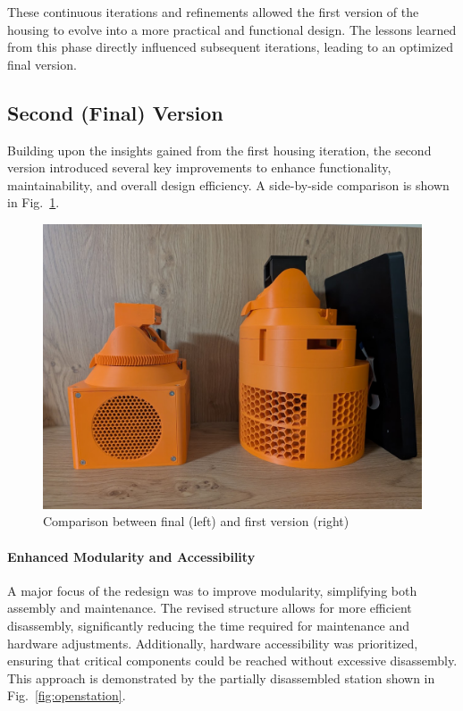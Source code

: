 These continuous iterations and refinements allowed the first version of the housing to evolve into a more practical and functional design. The lessons learned from this phase directly influenced subsequent iterations, leading to an optimized final version.  
  
\subsection{Second (Final) Version}\label{subsec:housing_second_version}
Building upon the insights gained from the first housing iteration, the second version introduced several key improvements to enhance functionality, maintainability, and overall design efficiency. A side-by-side comparison is shown in Fig.~\ref{fig:oldandnewstationcomparison}.

\begin{figure}[H]
	\centering
	\includegraphics[width=1.0\linewidth]{figures/old_and_new_station_comparison}
	\caption{Comparison between final (left) and first version (right)}
	\label{fig:oldandnewstationcomparison}
\end{figure}

\paragraph{Enhanced Modularity and Accessibility}  
A major focus of the redesign was to improve modularity, simplifying both assembly and maintenance. The revised structure allows for more efficient disassembly, significantly reducing the time required for maintenance and hardware adjustments. Additionally, hardware accessibility was prioritized, ensuring that critical components could be reached without excessive disassembly. This approach is demonstrated by the partially disassembled station shown in Fig.~\ref{fig:openstation}.

